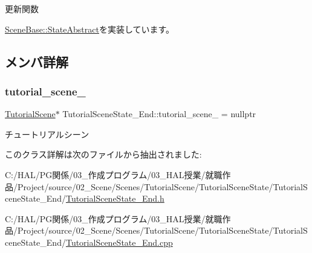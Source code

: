 更新関数 



\mbox{\hyperlink{class_scene_base_1_1_state_abstract_a7fca4c5e7d0174af8a147c404f4e6eee}{Scene\+Base\+::\+State\+Abstract}}を実装しています。



\subsection{メンバ詳解}
\mbox{\label{class_tutorial_scene_state___end_a68f36e80b530182a5b5d835425b7e829}} 
\subsubsection{\texorpdfstring{tutorial\+\_\+scene\+\_\+}{tutorial\_scene\_}}
{\footnotesize\ttfamily \mbox{\hyperlink{class_tutorial_scene}{Tutorial\+Scene}}$\ast$ Tutorial\+Scene\+State\+\_\+\+End\+::tutorial\+\_\+scene\+\_\+ = nullptr\hspace{0.3cm}{\ttfamily [protected]}}



チュートリアルシーン 



このクラス詳解は次のファイルから抽出されました\+:\begin{DoxyCompactItemize}
\item 
C\+:/\+H\+A\+L/\+P\+G関係/03\+\_\+作成プログラム/03\+\_\+\+H\+A\+L授業/就職作品/\+Project/source/02\+\_\+\+Scene/\+Scenes/\+Tutorial\+Scene/\+Tutorial\+Scene\+State/\+Tutorial\+Scene\+State\+\_\+\+End/\mbox{\hyperlink{_tutorial_scene_state___end_8h}{Tutorial\+Scene\+State\+\_\+\+End.\+h}}\item 
C\+:/\+H\+A\+L/\+P\+G関係/03\+\_\+作成プログラム/03\+\_\+\+H\+A\+L授業/就職作品/\+Project/source/02\+\_\+\+Scene/\+Scenes/\+Tutorial\+Scene/\+Tutorial\+Scene\+State/\+Tutorial\+Scene\+State\+\_\+\+End/\mbox{\hyperlink{_tutorial_scene_state___end_8cpp}{Tutorial\+Scene\+State\+\_\+\+End.\+cpp}}\end{DoxyCompactItemize}
